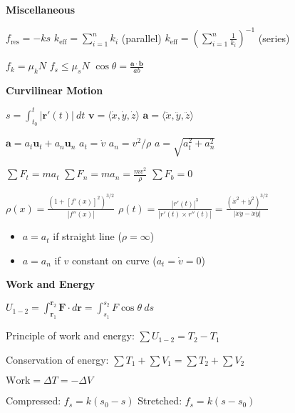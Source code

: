 \documentclass[twocolumn]{article}
\begin{document}
\textbf{Miscellaneous}

$f_{\text{res}} = -ks$ \hfill $k_{\text{eff}} = \sum\limits_{i=1}^n k_i$ (parallel) \hfill $k_{\text{eff}} = \left( \sum\limits_{i=1}^n \frac{1}{k_i} \right)^{-1}$ (series)

$f_k = \mu_k N$ \hfill $f_s \leq \mu_s N$ \hfill $\cos \theta = \frac{\mathbf{a} \cdot \mathbf{b}}{ab}$



\newpage


\textbf{Curvilinear Motion}

$s = \displaystyle\int_{t_0}^t |\mathbf{r}'(t)|\ dt$ \hfill $\mathbf{v} = \langle \dot{x}, \dot{y}, \dot{z} \rangle$ \hfill $\mathbf{a} = \langle \ddot{x}, \ddot{y}, \ddot{z} \rangle$

$\mathbf{a} = a_t \mathbf{u}_t + a_n \mathbf{u}_n$ \hfill $a_t = \dot{v}$ \hfill $a_n = v^2 / \rho$ \hfill $a = \sqrt{a_t^2 + a_n^2}$

$\sum F_t = ma_t$ \hfill $\sum F_n = ma_n = \frac{mv^2}{\rho}$ \hfill $\sum F_b = 0$

$\rho(x) = \frac{(1 + [f'(x)]^2)^{3/2}}{|f''(x)|}$ \hfill $\rho(t) = \frac{| r'(t) |^3}{| r'(t) \times r''(t) |} = \frac{(\dot{x}^2 + \dot{y}^2 )^{3/2}}{|\dot{x} \ddot{y} - \ddot{x} \dot{y}|}$

\vspace{-.5em}
\begin{itemize}
    \item $a = a_t$ if straight line ($\rho = \infty$)
    \item $a = a_n$ if $v$ constant on curve ($a_t = \dot{v} = 0$)
\end{itemize} \vspace{-1em}

\vspace{-.5em}
\dotfill

\textbf{Work and Energy}

$U_{1-2} = \int_{\mathbf{r}_1}^{\mathbf{r}_2} \mathbf{F} \cdot d \mathbf{r} = \int_{s_1}^{s_2} F \cos \theta\ ds$ 

Principle of work and energy: $\sum U_{1-2} = T_2 - T_1$

Conservation of energy: $\sum T_1 + \sum V_1 = \sum T_2 + \sum V_2$

$\text{Work} = \Delta T = - \Delta V$

Compressed: $f_s = k(s_0 - s)$ \hfill Stretched: $f_s = k(s - s_0)$
\end{document}
